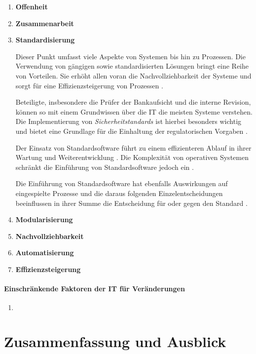 \begin{enumerate}
    \item \textbf{Offenheit}
    
    \item \textbf{Zusammenarbeit}

    \item \textbf{Standardisierung} 
    
    Dieser Punkt umfasst viele Aspekte von Systemen bis hin zu Prozessen. Die Verwendung von gängigen sowie standardisierten Lösungen bringt eine Reihe von Vorteilen. Sie erhöht allen voran die Nachvollziehbarkeit der Systeme und sorgt für eine Effizienzsteigerung von Prozessen \cite{Strietzel2018, Bussmann2006, Alt2017}. 
    
    Beteiligte, insbesondere die Prüfer der Bankaufsicht und die interne Revision, können so mit einem Grundwissen über die IT die meisten Systeme verstehen. Die Implementierung von \emph{Sicherheitstandards \cite{IT-Grundschutz:2020, Disterer2013}} ist hierbei besonders wichtig und bietet eine Grundlage für die Einhaltung der regulatorischen Vorgaben \cite{MaRisk:2017, BAIT:2018}.
    
    Der Einsatz von Standardsoftware führt zu einem effizienteren Ablauf in ihrer Wartung und Weiterentwicklung \cite{Bussmann2006}. Die Komplexität von operativen Systemen schränkt die Einführung von Standardsoftware jedoch ein \cite{Bussmann2006, S. 27}. 
    
    Die Einführung von Standardsoftware hat ebenfalls Auswirkungen auf eingespielte Prozesse und die daraus folgenden Einzelentscheidungen beeinflussen in ihrer Summe die Entscheidung für oder gegen den Standard \cite{Manz2018}.
    
    \item \textbf{Modularisierung}
    
    \item \textbf{Nachvollziehbarkeit}
    
    \item \textbf{Automatisierung}
    
    \item \textbf{Effizienzsteigerung}
\end{enumerate}


\paragraph{Einschränkende Faktoren der IT für Veränderungen}
\begin{enumerate}
    \item 
\end{enumerate}


\section{Zusammenfassung und Ausblick}